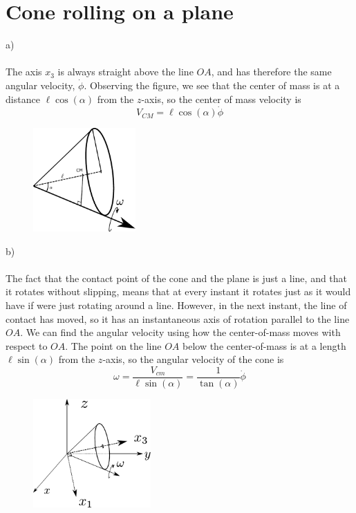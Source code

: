 \documentclass{article}
\begin{document}
    \section{Cone rolling on a plane}
        a) \\ \\
        The axis $x_3$ is always straight above the line $OA$, and has therefore the same angular velocity, $\dot \phi$. Observing the figure, we see that the center of mass is at a distance $\ell \cos(\alpha)$ from the $z$-axis, so the center of mass velocity is
        \begin{equation*}
            V_{CM} = \ell \cos(\alpha) \dot \phi
        \end{equation*} 
        \begin{figure}
            \includegraphics[width=0.35\textwidth]{figures/exercise_7_3_cone2.pdf}
        \end{figure}
        b) \\ \\
        The fact that the contact point of the cone and the plane is just a line, and that it rotates without slipping, means that at every instant it rotates just as it would have if were just rotating around a line. However, in the next instant, the line of contact has moved, so it has an instantaneous axis of rotation parallel to the line $OA$. We can find the angular velocity using how the center-of-mass moves with respect to $OA$. The point on the line $OA$ below the center-of-mass is at a length $\ell \sin(\alpha)$ from the $z$-axis, so the angular velocity of the cone is
        \begin{equation*}
            \omega = \frac{V_{cm}}{\ell \sin(\alpha)} = \frac{1}{\tan(\alpha)} \dot \phi
        \end{equation*}
        \begin{figure}
            \includegraphics[width=0.4\textwidth]{figures/exercise_7_3_cone3.pdf}
        \end{figure}
\end{document}

